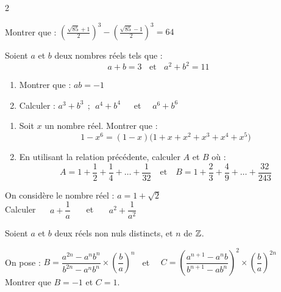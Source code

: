 \documentclass[10pt, a4paper]{article}
\begin{document}
\begin{multicols*}{2}
\begin{Exercice}[][20 min][★★]
Montrer que : \quad
$ \left( \frac{\sqrt{85}+1}{2} \right)^3 - \left( \frac{\sqrt{85}-1}{2} \right)^3 = 64$
\end{Exercice}

\begin{Exercice}[][20 min][★★★]
Soient $a$ et $b$ deux nombres réels tels que :
\begin{equation*}
    a+b=3   ~~~~\text{et}~~~~  a^2+b^2=11
\end{equation*}
\begin{enumerate}
    \item Montrer que : $ab=-1$
    \item Calculer : $a^3+b^3~~;~~a^4+b^4~$ ~~et~~ $a^6+b^6$
\end{enumerate}
\end{Exercice}

\begin{Exercice}[][20 min][★★★]
\begin{enumerate}
    \item Soit $x$ un nombre réel. Montrer que :
    \[ 1 - x^6 = (1 - x)\big(1 + x + x^2 + x^3 + x^4 + x^5\big) \]
    \item En utilisant la relation précédente, calculer $A$ et $B$ où :
    \[ A = 1 + \frac{1}{2} + \frac{1}{4} + \dots + \frac{1}{32} \quad \text{et} \quad B = 1 + \frac{2}{3} + \frac{4}{9} + \dots + \frac{32}{243} \]
\end{enumerate}
\end{Exercice}

\begin{Exercice}[][20 min][★★]
On considère le nombre réel : $a=1+\sqrt{2}$
\vspace{0.2cm} \\
Calculer ~~ $a+\dfrac{1}{a}$ ~~~et~~~ $a^2+\dfrac{1}{a^2}$
\end{Exercice}




\begin{Exercice}[][20 min][★★]
Soient $a$ et $b$ deux réels non nuls distincts, et $n$ de $\mathbb{Z}$.

On pose : $B = \dfrac{a^{2n} - a^nb^n}{b^{2n} - a^nb^n} \times \left(\dfrac{b}{a}\right)^n$ ~et~~ $C = \left(\dfrac{a^{n+1} - a^nb}{b^{n+1} - ab^n}\right)^2 \times \left(\dfrac{b}{a}\right)^{2n}$
\vspace{0.2cm}\\
Montrer que $B=-1$ et $C=1$.
\end{Exercice}



\end{multicols*}
\end{document}
